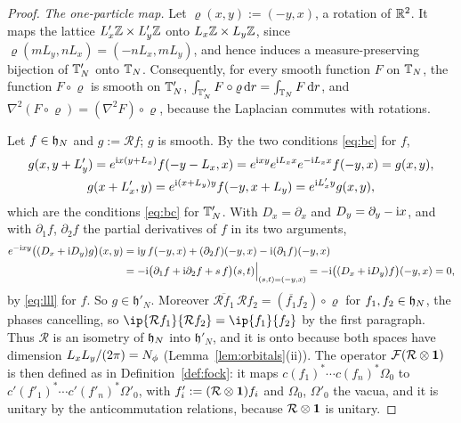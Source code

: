 \begin{proof}
\emph{The one-particle map.} Let $\varrho(x,y):=(-y,x)$, a rotation of $\mathbb{R}^2$. It maps the lattice $L'_x\mathbb{Z}\times L'_y\mathbb{Z}$
onto $L_x\mathbb{Z}\times L_y\mathbb{Z}$, since $\varrho(mL_y,nL_x)=(-nL_x,mL_y)$, and hence induces a measure-preserving bijection of
$\mathbb{T}'_N$ onto $\mathbb{T}_N$. Consequently, for every smooth function $F$ on $\mathbb{T}_N$, the function $F\circ\varrho$ is smooth on
$\mathbb{T}'_N$, $\int_{\mathbb{T}'_N}F\circ\varrho\,\mathrm{d} r=\int_{\mathbb{T}_N}F\,\mathrm{d} r$, and $\nabla^2(F\circ\varrho)=(\nabla^2F)\circ\varrho$, because
the Laplacian commutes with rotations.

Let $f\in\mathfrak{h}_N$ and $g:=\mathcal Rf$; $g$ is smooth. By the two conditions \eqref{eq:bc} for $f$,
\begin{gather*}
g(x,y+L'_y)=e^{\mathrm{i} x(y+L_x)}f(-y-L_x,x)=e^{\mathrm{i} xy}e^{\mathrm{i} L_xx}e^{-\mathrm{i} L_xx}f(-y,x)=g(x,y),\\
g(x+L'_x,y)=e^{\mathrm{i}(x+L_y)y}f(-y,x+L_y)=e^{\mathrm{i} L'_xy}g(x,y),
\end{gather*}
which are the conditions \eqref{eq:bc} for $\mathbb{T}'_N$. With $D_x=\partial_x$ and $D_y=\partial_y-\mathrm{i} x$, and with
$\partial_1f$, $\partial_2f$ the partial derivatives of $f$ in its two arguments,
\begin{align*}
e^{-\mathrm{i} xy}\bigl((D_x+\mathrm{i} D_y)g\bigr)(x,y)&=\mathrm{i} y\,f(-y,x)+(\partial_2f)(-y,x)-\mathrm{i}(\partial_1f)(-y,x)\\
&=-\mathrm{i}\bigl(\partial_1f+\mathrm{i}\partial_2f+s\,f\bigr)(s,t)\Big|_{(s,t)=(-y,x)}=-\mathrm{i}\bigl((D_x+\mathrm{i} D_y)f\bigr)(-y,x)=0,
\end{align*}
by \eqref{eq:lll} for $f$. So $g\in\mathfrak h'_N$. Moreover $\overline{\mathcal Rf_1}\,\mathcal Rf_2=(\overline{f_1}f_2)\circ\varrho$ for
$f_1,f_2\in\mathfrak{h}_N$, the phases cancelling, so $\ip{\mathcal Rf_1}{\mathcal Rf_2}=\ip{f_1}{f_2}$ by the first paragraph. Thus
$\mathcal R$ is an isometry of $\mathfrak{h}_N$ into $\mathfrak h'_N$, and it is onto because both spaces have dimension
$L_xL_y/(2\pi)=N_{\phi}$ (Lemma~\ref{lem:orbitals}(ii)). The operator $\mathcal{F}(\mathcal R\otimes\mathbf{1})$ is then defined as in
Definition~\ref{def:fock}: it maps $c(f_1)^*\cdots c(f_n)^*\Omega_0$ to $c'(f'_1)^*\cdots c'(f'_n)^*\Omega'_0$, with
$f'_i:=(\mathcal R\otimes\mathbf{1})f_i$ and $\Omega_0$, $\Omega'_0$ the vacua, and it is unitary by the anticommutation
relations, because $\mathcal R\otimes\mathbf{1}$ is unitary.


\end{proof}
